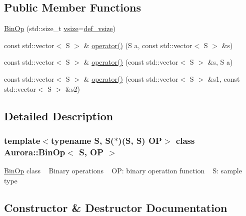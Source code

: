 \subsection*{Public Member Functions}
\begin{DoxyCompactItemize}
\item 
\hyperlink{class_aurora_1_1_bin_op_a14a9d73eaac2f6d3ac55094f575a9fa4}{Bin\+Op} (std\+::size\+\_\+t \hyperlink{class_aurora_1_1_snd_base_af9e21aaf411b17f7a8221c991ce5d291}{vsize}=\hyperlink{namespace_aurora_afaaddf667a06e7ce23c667a8b7295263}{def\+\_\+vsize})
\item 
const std\+::vector$<$ S $>$ \& \hyperlink{class_aurora_1_1_bin_op_aa1e2d8bf1a400b2298f736395cd58bca}{operator()} (S a, const std\+::vector$<$ S $>$ \&s)
\item 
const std\+::vector$<$ S $>$ \& \hyperlink{class_aurora_1_1_bin_op_a3e182103fef21158d0a697e1dd687b47}{operator()} (const std\+::vector$<$ S $>$ \&s, S a)
\item 
const std\+::vector$<$ S $>$ \& \hyperlink{class_aurora_1_1_bin_op_afd027823b576a0c4a66e7d119bfb01d4}{operator()} (const std\+::vector$<$ S $>$ \&s1, const std\+::vector$<$ S $>$ \&s2)
\end{DoxyCompactItemize}


\subsection{Detailed Description}
\subsubsection*{template$<$typename S, S($\ast$)(\+S, S) OP$>$\newline
class Aurora\+::\+Bin\+Op$<$ S, O\+P $>$}

\hyperlink{class_aurora_1_1_bin_op}{Bin\+Op} class ~\newline
Binary operations ~\newline
OP\+: binary operation function ~\newline
S\+: sample type 

\subsection{Constructor \& Destructor Documentation}
\mbox{\label{class_aurora_1_1_bin_op_a14a9d73eaac2f6d3ac55094f575a9fa4}} 

